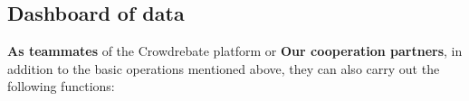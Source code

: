 \subsection{Dashboard of data}

\textbf{As teammates} of the Crowdrebate platform or \textbf{Our cooperation partners}, in addition to the basic operations mentioned above, they can also carry out the following functions:

\begin{figure}[t!] \vspace{-1ex}
\end{figure}
